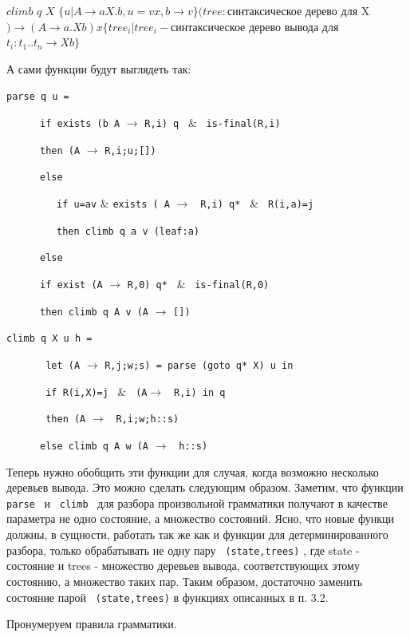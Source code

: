 $climb$ $q$ $X$ $\{ u | A \rightarrow aX.b, u = vx, b \rightarrow v \} (tree: $синтаксическое дерево для X$) \rightarrow (A \rightarrow a.Xb) x \{tree_i | tree_i  - $синтаксическое дерево вывода для $ t_i : t_1 .. t_n  \rightarrow  Xb\}$

А сами функции будут выглядеть так:


\verb|parse q u =|

\ \ \ \ \ \  \verb|if exists (b A| $\rightarrow$ \verb|R,i) q| \ $\&$ \ \verb|is-final(R,i)| 
  
\ \ \ \ \ \  \verb|then (A| $\rightarrow$ \verb|R,i;u;[])|

\ \ \ \ \ \  \verb|else|

\ \ \ \ \ \ \ \ \ \verb|if u=av| $\&$ \verb|exists ( A| $\rightarrow$ \verb| R,i) q* | $\&$ \verb| R(i,a)=j| 
     
\ \ \ \ \ \ \ \ \ \verb|then climb q a v (leaf:a)|
     
\ \ \ \ \ \  \verb|else|
     
\ \ \ \ \ \  \verb|if exist (A| $\rightarrow$ \verb|R,0) q*| \ $\&$ \ \verb|is-final(R,0)| 
        
        
\ \ \ \ \ \  \verb|then climb q A v (A| $\rightarrow$ \verb|[])|
        
\verb|climb q X u h = |

\ \ \ \ \ \  \verb| let (A| $\rightarrow$ \verb|R,j;w;s) = parse (goto q* X) u in|
  
  \ \ \ \ \ \ \verb| if R(i,X)=j| \ $\&$ \ \verb|(A|$\rightarrow$ \verb| R,i) in q| 
  
  \ \ \ \ \ \ \verb| then (A| $\rightarrow$ \verb| R,i;w;h::s)|
   
  \ \ \ \ \ \ \verb|else climb q A w (A| $\rightarrow$ \verb| h::s)|
  
Теперь нужно обобщить эти функции для случая, когда возможно несколько деревьев вывода. Это можно сделать следующим образом. Заметим, что функции \verb| parse| \ и \verb| climb| \ для разбора произвольной грамматики получают в качестве параметра не одно состояние, а множество состояний. Ясно, что новые функци должны, в сущности, работать так же как и функции для детерминированного разбора, только обрабатывать не одну пару \verb| (state,trees)| , где state - состояние и trees - множество деревьев вывода, соответствующих этому состоянию, а множество таких пар. Таким образом, достаточно заменить состояние парой \verb| (state,trees)| в функциях описанных в п. 3.2.

Пронумеруем правила грамматики.

